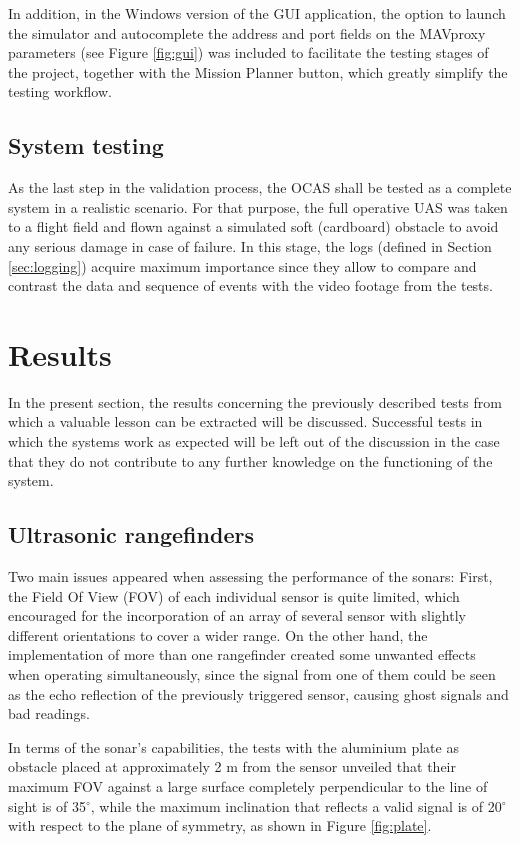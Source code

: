 In addition, in the Windows version of the GUI application, the option to launch the simulator and autocomplete the address and port fields on the MAVproxy parameters (see Figure \ref{fig:gui}) was included to facilitate the testing stages of the project, together with the Mission Planner button, which greatly simplify the testing workflow.

\subsection{System testing}

As the last step in the validation process, the OCAS shall be tested as a complete system in a realistic scenario.
For that purpose, the full operative UAS was taken to a flight field and flown against a simulated soft (cardboard) obstacle to avoid any serious damage in case of failure.
In this stage, the logs (defined in Section \ref{sec:logging}) acquire maximum importance since they allow to compare and contrast the data and sequence of events with the video footage from the tests.


\section{Results}

In the present section, the results concerning the previously described tests from which a valuable lesson can be extracted will be discussed.
Successful tests in which the systems work as expected will be left out of the discussion in the case that they do not contribute to any further knowledge on the functioning of the system.

\subsection{Ultrasonic rangefinders}

Two main issues appeared when assessing the performance of the sonars: First, the Field Of View (FOV) of each individual sensor is quite limited, which encouraged for the incorporation of an array of several sensor with slightly different orientations to cover a wider range.
On the other hand, the implementation of more than one rangefinder created some unwanted effects when operating simultaneously, since the signal from one of them could be seen as the echo reflection of the previously triggered sensor, causing ghost signals and bad readings.

In terms of the sonar's capabilities, the tests with the aluminium plate as obstacle placed at approximately 2 m from the sensor unveiled that their maximum FOV against a large surface completely perpendicular to the line of sight is of 35$^\circ$, while the maximum inclination that reflects a valid signal is of 20$^\circ$ with respect to the plane of symmetry, as shown in Figure \ref{fig:plate}.

